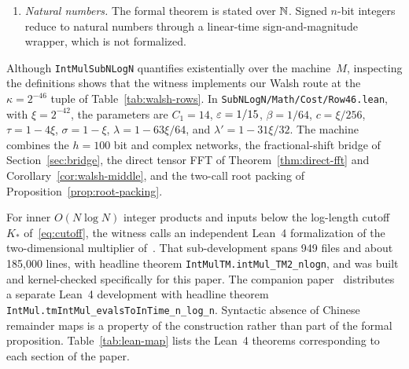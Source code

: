 \begin{enumerate}[label=(\alph*),leftmargin=*,itemsep=2pt]
\item \emph{Natural numbers.} The formal theorem is stated over $\mathbb{N}$. Signed $n$-bit integers reduce to natural numbers through a linear-time sign-and-magnitude wrapper, which is not formalized.
\end{enumerate}

Although \texttt{IntMulSubNLogN} quantifies existentially over the machine~$M$, inspecting the definitions shows that the witness implements our Walsh route at the $\kappa=2^{-46}$ tuple of Table~\ref{tab:walsh-rows}. In \texttt{SubNLogN/Math/Cost/Row46.lean}, with $\xi=2^{-42}$, the parameters are $C_1=14$, $\varepsilon=1/15$, $\beta=1/64$, $c=\xi/256$, $\tau=1-4\xi$, $\sigma=1-\xi$, $\lambda=1-63\xi/64$, and $\lambda'=1-31\xi/32$. The machine combines the $h=100$ bit and complex networks, the fractional-shift bridge of Section~\ref{sec:bridge}, the direct tensor FFT of Theorem~\ref{thm:direct-fft} and Corollary~\ref{cor:walsh-middle}, and the two-call root packing of Proposition~\ref{prop:root-packing}.

For inner $O(N\log N)$ integer products and inputs below the log-length cutoff $K_*$ of~\eqref{eq:cutoff}, the witness calls an independent Lean~4 formalization of the two-dimensional multiplier of~\cite{MS}. That sub-development spans 949 files and about 185{,}000 lines, with headline theorem \texttt{IntMulTM.\allowbreak intMul\_\allowbreak TM2\_\allowbreak nlogn}, and was built and kernel-checked specifically for this paper. The companion paper~\cite{MS} distributes a separate Lean~4 development with headline theorem \texttt{IntMul.\allowbreak tmIntMul\_\allowbreak evalsToInTime\_\allowbreak n\_\allowbreak log\_\allowbreak n}. Syntactic absence of Chinese remainder maps is a property of the construction rather than part of the formal proposition. Table~\ref{tab:lean-map} lists the Lean~4 theorems corresponding to each section of the paper.

